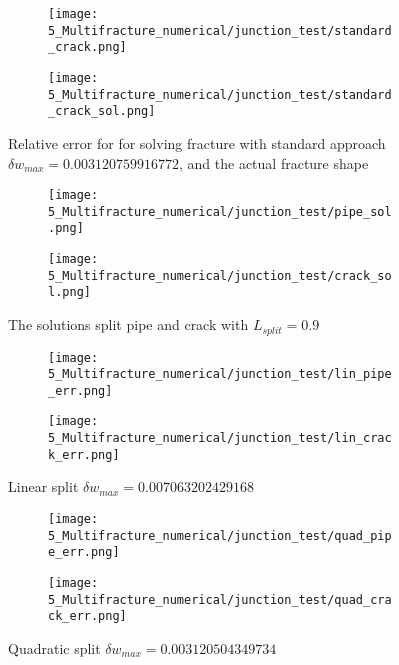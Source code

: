 \begin{figure}[H]
	\centering
	\begin{subfigure}{0.45\textwidth}
		\centering
		\texttt{[image: 5\_Multifracture\_numerical/junction\_test/standard\_crack.png]}
	\end{subfigure}
	\begin{subfigure}{0.45\textwidth}
		\centering
		\texttt{[image: 5\_Multifracture\_numerical/junction\_test/standard\_crack\_sol.png]}
	\end{subfigure}
	\caption{Relative error for for solving fracture with standard approach $\delta w_{max}=0.003120759916772$, and the actual fracture shape}
\end{figure}

\begin{figure}[H]
	\centering
	\begin{subfigure}{0.45\textwidth}
		\centering
		\texttt{[image: 5\_Multifracture\_numerical/junction\_test/pipe\_sol.png]}
	\end{subfigure}
	\begin{subfigure}{0.45\textwidth}
		\centering
		\texttt{[image: 5\_Multifracture\_numerical/junction\_test/crack\_sol.png]}
	\end{subfigure}
	\caption{The solutions split pipe and crack with $L_{split}=0.9$}
\end{figure}

\begin{figure}[H]
	\centering
	\begin{subfigure}{0.45\textwidth}
		\centering
		\texttt{[image: 5\_Multifracture\_numerical/junction\_test/lin\_pipe\_err.png]}
	\end{subfigure}
	\begin{subfigure}{0.45\textwidth}
		\centering
		\texttt{[image: 5\_Multifracture\_numerical/junction\_test/lin\_crack\_err.png]}
	\end{subfigure}
	\caption{Linear split $\delta w_{max}=0.007063202429168$}
\end{figure}

\begin{figure}[H]
	\centering
	\begin{subfigure}{0.45\textwidth}
		\centering
		\texttt{[image: 5\_Multifracture\_numerical/junction\_test/quad\_pipe\_err.png]}
	\end{subfigure}
	\begin{subfigure}{0.45\textwidth}
		\centering
		\texttt{[image: 5\_Multifracture\_numerical/junction\_test/quad\_crack\_err.png]}
	\end{subfigure}
	\caption{Quadratic split $\delta w_{max}=0.003120504349734$}
\end{figure}


